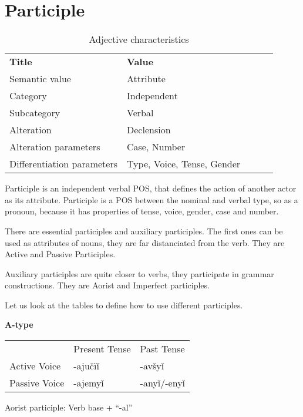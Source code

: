 \section{Participle}

\begin{table}[h]
	\caption{Adjective characteristics}
	\begin{tabular}{lllll}
		\textbf{Title}              & \textbf{Value}               \\
		Semantic value              & Attribute                    \\
		Category                    & Independent                  \\
		Subcategory                 & Verbal                       \\
		Alteration                  & Declension                   \\
		Alteration parameters       & Case, Number                 \\
		Differentiation parameters  & Type, Voice, Tense, Gender
	\end{tabular}
\end{table}

Participle is an independent verbal POS, that defines the action of another actor as its attribute. Participle is a POS between the nominal and verbal type, so as a pronoun, because it has properties of tense, voice, gender, case and number.

There are essential participles and auxiliary participles. The first ones can be used as attributes of nouns, they are far distanciated from the verb. They are Active and Passive Participles.

Auxiliary participles are quite closer to verbs, they participate in grammar constructions. They are Aorist and Imperfect participles.

Let us look at the tables to define how to use different participles.

\textbf{A-type}

\begin{table}
	\begin{tabular}{lll}
		& Present Tense & Past Tense \\
		 Active Voice & -ajučïǐ & -avšyǐ \\
		 Passive Voice & -ajemyǐ & -anyǐ/-enyǐ
	\end{tabular}
\end{table}

Aorist participle: Verb base + “-al”

